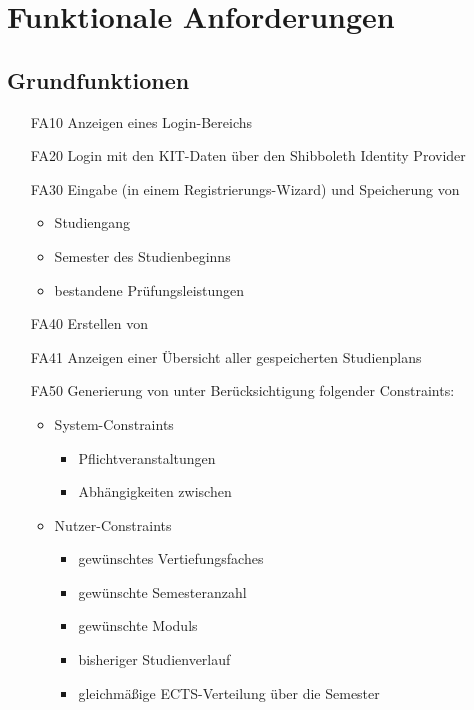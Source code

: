 \section{Funktionale Anforderungen}

	\subsection{Grundfunktionen}
	\begin{itemize}[nosep]	
		\item [FA10] Anzeigen eines Login-Bereichs
		\item[FA20] Login mit den KIT-Daten über den \gls{Shibboleth Identity Provider}
		\item [FA30]Eingabe (in einem Registrierungs-\gls{Wizard}) und Speicherung von
		\begin{itemize}[nosep]
			\item Studiengang
			\item \gls {Semester des Studienbeginns}
			\item bestandene Prüfungsleistungen
		\end{itemize}
		\item [FA40] Erstellen von 
		\item [FA41]Anzeigen einer Übersicht aller gespeicherten \glspl{Studienplan}
		\item [FA50] Generierung von  unter Berücksichtigung folgender \glspl{Constraint}:
			\begin{itemize}[nosep]
				\item \glspl{System-Constraint}
				\begin{itemize}[nosep]
					\item Pflichtveranstaltungen
					\item Abhängigkeiten zwischen 
				\end{itemize}
				\item \glspl{Nutzer-Constraint}
				\begin{itemize}[nosep]
					\item gewünschtes Vertiefungsfaches
					\item gewünschte Semesteranzahl
					\item gewünschte \glspl{Modul}
					\item  bisheriger Studienverlauf
					\item gleichmäßige ECTS-Verteilung über die Semester
				\end{itemize}

\end{itemize}
\end{itemize}
